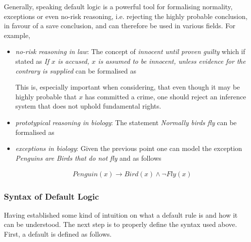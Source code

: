 \documentclass{article}
\begin{document}
Generally, speaking default logic is a powerful tool for formalising normality, exceptions  or even no-risk reasoning, i.e. rejecting the highly probable conclusion, in favour of a save conclusion, and can therefore be used in various fields.
For example, 
\begin{itemize}
\item \emph{no-risk reasoning in law}: The concept of \emph{innocent until proven guilty }which if stated as \emph{If $x$ is accused, $x$ is assumed to be innocent, unless evidence for the contrary is supplied} can be formalised as

\begin{prooftree}
\end{prooftree}


This is, especially important when considering, that even though it may be highly probable that $x$ has committed a crime, one should reject an inference system that does not uphold fundamental rights.  

\item \emph{prototypical reasoning in biology}: The statement \emph{Normally birds fly} can be formalised as 

\begin{prooftree}
\end{prooftree}


\item \emph{exceptions in biology}: Given the previous point one can model the exception  \emph{Penguins are Birds that do not fly} and as follows

\begin{equation*}
\begin{split}
Penguin(x) \to  Bird(x) \wedge \neg Fly(x)
\end{split}
\end{equation*}
\end{itemize} 



\subsubsection*{Syntax of Default Logic}
Having established some kind of intuition on what a default rule is and how it can be understood. The next step is to properly define the syntax used above. First, a default is defined as follows. 
\end{document}
